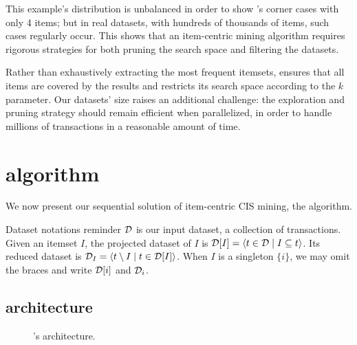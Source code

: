 This example's distribution is unbalanced in order to show \toppi's corner cases with only 4 items;
but in real datasets, with hundreds of thousands of items, such cases regularly occur.
This shows that an item-centric mining algorithm requires rigorous strategies
for both pruning the search space and filtering the datasets.


Rather than exhaustively extracting the most frequent itemsets,
\toppi ensures that all items are covered by the results
and restricts its search space according to the $k$ parameter.
Our datasets' size raises an additional challenge:
the exploration and pruning strategy should remain efficient
when parallelized, in order to handle millions of transactions
in a reasonable amount of time.










\section{\toppi algorithm}
\label{sec:toppi:algo}

We now present our sequential solution of item-centric CIS mining, the \toppi algorithm.

\begin{paragraph}{Dataset notations reminder}
	$\cal D$ is our input dataset, a collection of transactions.
	Given an itemset $I$, the projected dataset of $I$ is
	${\cal D}[I] = \langle t \in {\cal D} \mid I \subseteq t \rangle$.
	Its reduced dataset is ${\cal D}_I = \langle t \setminus I \mid t \in {\cal D}[I]\rangle$.
	When $I$ is a singleton $\{i\}$, we may omit the braces and write ${\cal D}[i]$ and ${\cal D}_i$.
\end{paragraph}


\subsection{\toppi architecture}
\label{sec:algo:intro}

\begin{figure}
	\centering
	
	\caption{\label{fig:toppi:arch}
	\toppi's architecture.
	}
\end{figure}

